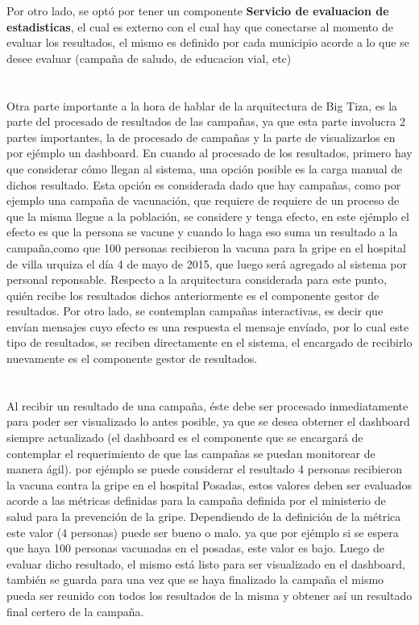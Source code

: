 \documentclass[a4paper, 11pt]{article}
\begin{document}
Por otro lado, se optó por tener un componente \textbf{Servicio de evaluacion de estadisticas}, el cual es externo con el cual hay que conectarse al momento de evaluar los resultados, el mismo es definido por cada municipio acorde a lo que se desee evaluar (campaña de saludo, de educacion vial, etc)\\
\\
\\
Otra parte importante a la hora de hablar de la arquitectura de Big Tiza, es la parte del procesado de resultados de las campañas, ya que esta parte involucra 2 partes importantes, la de procesado de campañas y la parte de visualizarlos en por ejémplo un dashboard.
En cuando al procesado de los resultados, primero hay que considerar cómo llegan al sistema, una opción posible es la carga manual de dichos resultado. Esta opción es considerada dado que hay campañas, como por ejemplo una campaña de vacunación, que requiere de requiere de un proceso de que la misma llegue a la población, se considere y tenga efecto, en este ejémplo el efecto es que la persona se vacune y cuando lo haga eso suma un resultado a la campaña,como que 100 personas recibieron la vacuna para la gripe en el hospital de villa urquiza el día 4 de mayo de 2015, que luego será agregado al sistema por personal reponsable.
Respecto a la arquitectura considerada para este punto, quién recibe los resultados dichos anteriormente es el componente gestor de resultados.
Por otro lado, se contemplan campañas interactivas, es decir que envían mensajes cuyo efecto es una respuesta el mensaje envíado, por lo cual este tipo de resultados, se reciben directamente en el sistema, el encargado de recibirlo nuevamente es el componente gestor de resultados.\\
\\
\\
Al recibir un resultado de una campaña, éste debe ser procesado inmediatamente para poder ser visualizado lo antes posible, ya que se desea obterner el dashboard siempre actualizado (el dashboard es el componente que se encargará de contemplar el requerimiento de que las campañas se puedan monitorear de manera ágil). por ejémplo se puede considerar el resultado 4 personas recibieron la vacuna contra la gripe en el hospital Posadas, estos valores deben ser evaluados acorde a las métricas definidas para la campaña definida por el ministerio de salud para la prevención de la gripe. Dependiendo de la definición de la métrica este valor (4 personas) puede ser bueno o malo. ya que por ejémplo si se espera que haya 100 personas vacunadas en el posadas, este valor es bajo. Luego de evaluar dicho resultado, el mismo está listo para ser visualizado en el dashboard, también se guarda para una vez que se haya finalizado la campaña el mismo pueda ser reunido con todos los resultados de la misma y obtener así un resultado final certero de la campaña.\\
\end{document}
